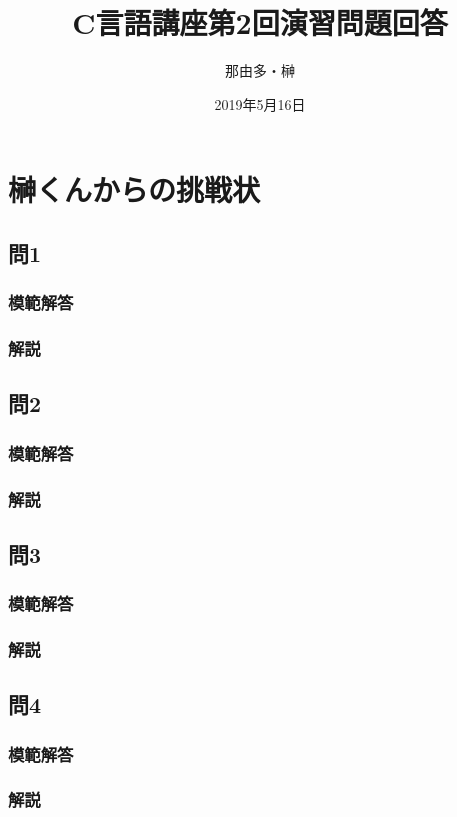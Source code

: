 \documentclass[a4j,titlepage,dvipdfmx]{jsarticle}   %
\title{C言語講座第2回演習問題回答}
\author{那由多・榊}
\date{2019年5月16日}
\newcommand{\codepath}{./code/02_Answer}
\begin{document}
\section{榊くんからの挑戦状}
\subsection{問1}
\subsubsection{模範解答}

\subsubsection{解説}

\subsection{問2}
\subsubsection{模範解答}

\subsubsection{解説}

\subsection{問3}
\subsubsection{模範解答}

\subsubsection{解説}

\subsection{問4}
\subsubsection{模範解答}

\subsubsection{解説}
\end{document}
